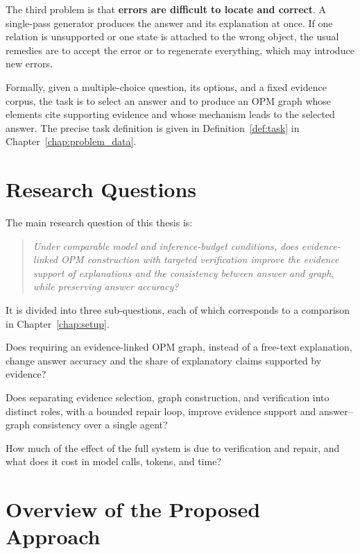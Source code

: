 The third problem is that \textbf{errors are difficult to locate and correct}. A single-pass generator produces the answer and its explanation at once. If one relation is unsupported or one state is attached to the wrong object, the usual remedies are to accept the error or to regenerate everything, which may introduce new errors.

Formally, given a multiple-choice question, its options, and a fixed evidence corpus, the task is to select an answer and to produce an OPM graph whose elements cite supporting evidence and whose mechanism leads to the selected answer. The precise task definition is given in Definition~\ref{def:task} in Chapter~\ref{chap:problem_data}.

\section{Research Questions}
\label{sec:research_questions}

The main research question of this thesis is:

\begin{quote}
\emph{Under comparable model and inference-budget conditions, does evidence-linked OPM construction with targeted verification improve the evidence support of explanations and the consistency between answer and graph, while preserving answer accuracy?}
\end{quote}

It is divided into three sub-questions, each of which corresponds to a comparison in Chapter~\ref{chap:setup}.

\begin{description}[leftmargin=1.2cm, style=nextline]
  \item[RQ1] Does requiring an evidence-linked OPM graph, instead of a free-text explanation, change answer accuracy and the share of explanatory claims supported by evidence?
  \item[RQ2] Does separating evidence selection, graph construction, and verification into distinct roles, with a bounded repair loop, improve evidence support and answer--graph consistency over a single agent?
  \item[RQ3] How much of the effect of the full system is due to verification and repair, and what does it cost in model calls, tokens, and time?
\end{description}

\section{Overview of the Proposed Approach}
\label{sec:approach_overview}

